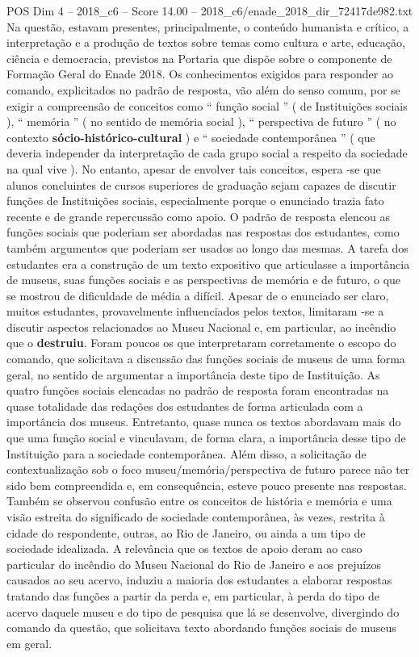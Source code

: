 \begin{textsample}{POS Dim 4 – 2018\_c6 – Score 14.00 – 2018\_c6/enade\_2018\_dir\_72417de982.txt}
Na questão, estavam presentes, principalmente, o conteúdo humanista e crítico, a interpretação e a produção de textos sobre temas como cultura e arte, educação, ciência e democracia, previstos na Portaria que dispõe sobre o componente de Formação Geral do Enade 2018.
Os conhecimentos exigidos para responder ao comando, explicitados no padrão de resposta, vão além do senso comum, por se exigir a compreensão de conceitos como “ função social ” ( de Instituições sociais ), “ memória ” ( no sentido de memória social ), “ perspectiva de futuro ” ( no contexto \textbf{sócio-histórico-cultural} ) e “ sociedade contemporânea ” ( que deveria independer da interpretação de cada grupo social a respeito da sociedade na qual vive ).
No entanto, apesar de envolver tais conceitos, espera -se que alunos concluintes de cursos superiores de graduação sejam capazes de discutir funções de Instituições sociais, especialmente porque o enunciado trazia fato recente e de grande repercussão como apoio.
O padrão de resposta elencou as funções sociais que poderiam ser abordadas nas respostas dos estudantes, como também argumentos que poderiam ser usados ao longo das mesmas.
A tarefa dos estudantes era a construção de um texto expositivo que articulasse a importância de museus, suas funções sociais e as perspectivas de memória e de futuro, o que se mostrou de dificuldade de média a difícil.
Apesar de o enunciado ser claro, muitos estudantes, provavelmente influenciados pelos textos, limitaram -se a discutir aspectos relacionados ao Museu Nacional e, em particular, ao incêndio que o \textbf{destruiu}.
Foram poucos os que interpretaram corretamente o escopo do comando, que solicitava a discussão das funções sociais de museus de uma forma geral, no sentido de argumentar a importância deste tipo de Instituição.
As quatro funções sociais elencadas no padrão de resposta foram encontradas na quase totalidade das redações dos estudantes de forma articulada com a importância dos museus.
Entretanto, quase nunca os textos abordavam mais do que uma função social e vinculavam, de forma clara, a importância desse tipo de Instituição para a sociedade contemporânea.
Além disso, a solicitação de contextualização sob o foco museu/memória/perspectiva de futuro parece não ter sido bem compreendida e, em consequência, esteve pouco presente nas respostas.
Também se observou confusão entre os conceitos de história e memória e uma visão estreita do significado de sociedade contemporânea, às vezes, restrita à cidade do respondente, outras, ao Rio de Janeiro, ou ainda a um tipo de sociedade idealizada.
A relevância que os textos de apoio deram ao caso particular do incêndio do Museu Nacional do Rio de Janeiro e aos prejuízos causados ao seu acervo, induziu a maioria dos estudantes a elaborar respostas tratando das funções a partir da perda e, em particular, à perda do tipo de acervo daquele museu e do tipo de pesquisa que lá se desenvolve, divergindo do comando da questão, que solicitava texto abordando funções sociais de museus em geral.

\end{textsample}
